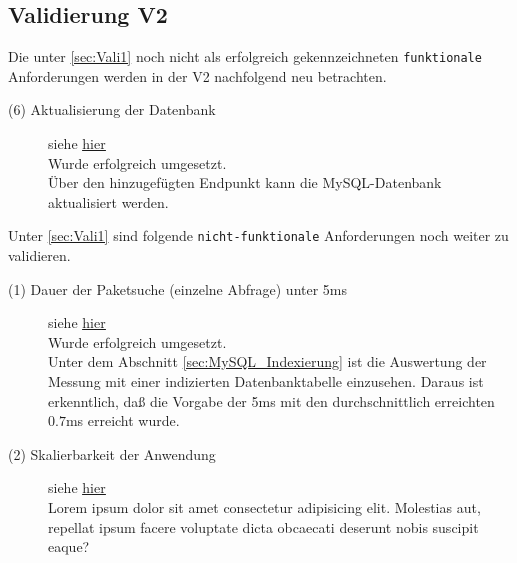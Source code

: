 \subsection{Validierung V2} \label{sec:Vali2}
    Die unter \ref{sec:Vali1}  noch nicht als erfolgreich gekennzeichneten \texttt{funktionale} Anforderungen werden in der V2 nachfolgend neu betrachten.

    \begin{description}
        \item[(6) Aktualisierung der Datenbank] siehe \hyperref[f:six]{\underline{hier}} \hfill \\
            Wurde erfolgreich umgesetzt.
            \\
            Über den hinzugefügten Endpunkt kann die MySQL-Datenbank aktualisiert werden.
    \end{description}

    \noindent Unter \ref{sec:Vali1}  sind folgende \texttt{nicht-funktionale} Anforderungen noch weiter zu validieren.

    \begin{description}
        \item[(1) Dauer der Paketsuche (einzelne Abfrage) unter 5ms] siehe \hyperref[nf:one]{\underline{hier}} \hfill \\
            Wurde erfolgreich umgesetzt.
            \\
            Unter dem Abschnitt \ref{sec:MySQL_Indexierung} ist die Auswertung der Messung mit einer indizierten Datenbanktabelle einzusehen.
            Daraus ist erkenntlich, daß die Vorgabe der 5ms mit den durchschnittlich erreichten $0.7$ms erreicht wurde.
        \item[(2) Skalierbarkeit der Anwendung] siehe \hyperref[nf:two]{\underline{hier}} \hfill \\
            Lorem ipsum dolor sit amet consectetur adipisicing elit. Molestias aut, repellat ipsum facere voluptate dicta obcaecati deserunt nobis suscipit eaque?
    \end{description}

